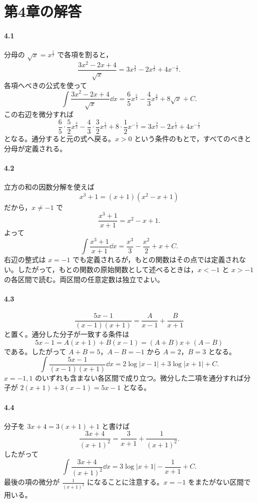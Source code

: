 \section{第4章の解答}\label{解答:第4章}

\paragraph{4.1}
分母の $\sqrt{x}=x^{\frac12}$ で各項を割ると，
\[
 \frac{3x^2-2x+4}{\sqrt{x}}
 =3x^{\frac32}-2x^{\frac12}+4x^{-\frac12}.
\]
各項へべきの公式を使って
\[
 \int\frac{3x^2-2x+4}{\sqrt{x}}\dd x
 =\frac65x^{\frac52}-\frac43x^{\frac32}+8\sqrt{x}+C.
\]
この右辺を微分すれば
\[
 \frac65\cdot\frac52x^{\frac32}
 -\frac43\cdot\frac32x^{\frac12}
 +8\cdot\frac12x^{-\frac12}
 =3x^{\frac32}-2x^{\frac12}+4x^{-\frac12}
\]
となる。通分すると元の式へ戻る。$x>0$ という条件のもとで，すべてのべきと分母が定義される。

\paragraph{4.2}
立方の和の因数分解を使えば
\[
 x^3+1=(x+1)(x^2-x+1)
\]
だから，$x\ne-1$ で
\[
 \frac{x^3+1}{x+1}=x^2-x+1.
\]
よって
\[
 \int\frac{x^3+1}{x+1}\dd x
 =\frac{x^3}{3}-\frac{x^2}{2}+x+C.
\]
右辺の整式は $x=-1$ でも定義されるが，もとの関数はその点では定義されない。したがって，もとの関数の原始関数として述べるときは，$x<-1$ と $x>-1$ の各区間で読む。両区間の任意定数は独立でよい。

\paragraph{4.3}
\[
 \frac{5x-1}{(x-1)(x+1)}
 =\frac A{x-1}+\frac B{x+1}
\]
と置く。通分した分子が一致する条件は
\[
 5x-1=A(x+1)+B(x-1)=(A+B)x+(A-B)
\]
である。したがって $A+B=5$，$A-B=-1$ から $A=2$，$B=3$ となる。
\[
 \int\frac{5x-1}{(x-1)(x+1)}\dd x
 =2\log|x-1|+3\log|x+1|+C.
\]
$x=-1,1$ のいずれも含まない各区間で成り立つ。微分した二項を通分すれば分子が $2(x+1)+3(x-1)=5x-1$ となる。

\paragraph{4.4}
分子を $3x+4=3(x+1)+1$ と書けば
\[
 \frac{3x+4}{(x+1)^2}
 =\frac3{x+1}+\frac1{(x+1)^2}.
\]
したがって
\[
 \int\frac{3x+4}{(x+1)^2}\dd x
 =3\log|x+1|-\frac1{x+1}+C.
\]
最後の項の微分が $\frac1{(x+1)^2}$ になることに注意する。$x=-1$ をまたがない区間で用いる。

